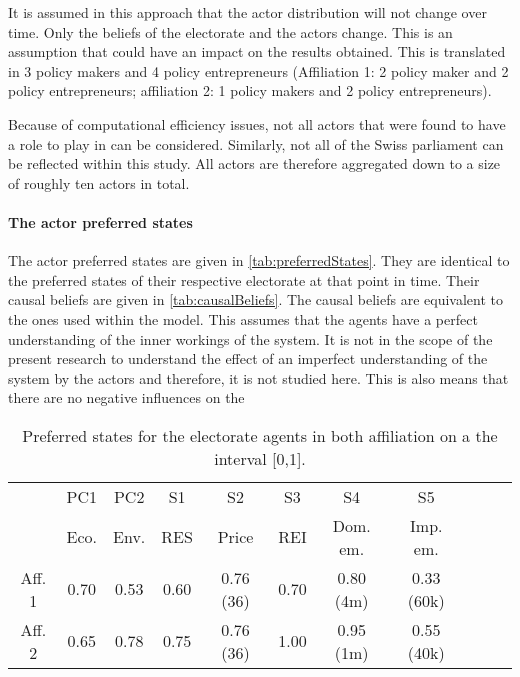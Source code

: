 It is assumed in this approach that the actor distribution will not change over time. Only the beliefs of the electorate and the actors change. This is an assumption that could have an impact on the results obtained. This is translated in 3 policy makers and 4 policy entrepreneurs (Affiliation 1: 2 policy maker and 2 policy entrepreneurs; affiliation 2: 1 policy makers and 2 policy entrepreneurs).

Because of computational efficiency issues, not all actors that were found to have a role to play in \cite{markard2016socio} can be considered. Similarly, not all of the Swiss parliament can be reflected within this study. All actors are therefore aggregated down to a size of roughly ten actors in total. 

\paragraph{The actor preferred states} The actor preferred states are given in \autoref{tab:preferredStates}. They are identical to the preferred states of their respective electorate at that point in time. Their causal beliefs are given in \autoref{tab:causalBeliefs}. The causal beliefs are equivalent to the ones used within the model. This assumes that the agents have a perfect understanding of the inner workings of the system. It is not in the scope of the present research to understand the effect of an imperfect understanding of the system by the actors and therefore, it is not studied here. This is also means that there are no negative influences on the 

\begin{table}
\begin{center}
\begin{tabular}{ |c|c|c|c|c|c|c|c|c|c|c| } 
\hline
		
		& PC1 	& PC2	& S1		& S2			& S3		& S4			& S5		\\ 
		& Eco.	& Env.	& RES	& Price		& REI	& Dom. em.	& Imp. em.	\\ \hline \hline
Aff. 1		& 0.70	& 0.53	& 0.60	& 0.76 (36)	& 0.70	& 0.80 (4m)	& 0.33 (60k)	\\ \hline
Aff. 2		& 0.65	& 0.78	& 0.75	& 0.76 (36) 	& 1.00	& 0.95 (1m)	& 0.55 (40k)	\\ 
\hline
\end{tabular}
\end{center}
\caption{Preferred states for the electorate agents in both affiliation on a the interval [0,1].}
\label{tab:preferredStates}
\end{table}

